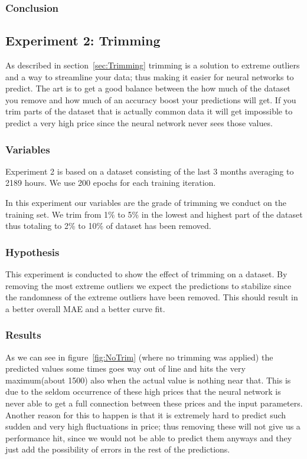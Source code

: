 \subsubsection{Conclusion}

\subsection{Experiment 2: Trimming}
As described in section~\ref{sec:Trimming} trimming is a solution to extreme outliers and a way to streamline your data; thus making it easier for neural networks to predict. The art is to get a good balance between the how much of the dataset you remove and how much of an accuracy boost your predictions will get. If you trim parts of the dataset that is actually common data it will get impossible to predict a very high price since the neural network never sees those values.

\subsubsection{Variables}
Experiment 2 is based on a dataset consisting of the last 3 months averaging to 2189 hours. We use 200 epochs for each training iteration.

In this experiment our variables are the grade of trimming we conduct on the training set. We trim from 1\% to 5\% in the lowest and highest part of the dataset thus totaling to 2\% to 10\% of dataset has been removed.

\subsubsection{Hypothesis}
This experiment is conducted to show the effect of trimming on a dataset. By removing the most extreme outliers we expect the predictions to stabilize since the randomness of the extreme outliers have been removed. This should result in a better overall MAE and a better curve fit.

\subsubsection{Results}

As we can see in figure~\ref{fig:NoTrim} (where no trimming was applied) the predicted values some times goes way out of line and hits the very maximum(about 1500) also when the actual value is nothing near that. This is due to the seldom occurrence of these high prices that the neural network is never able to get a full connection between these prices and the input parameters. Another reason for this to happen is that it is extremely hard to predict such sudden and very high fluctuations in price; thus removing these will not give us a performance hit, since we would not be able to predict them anyways and they just add the possibility of errors in the rest of the predictions.

